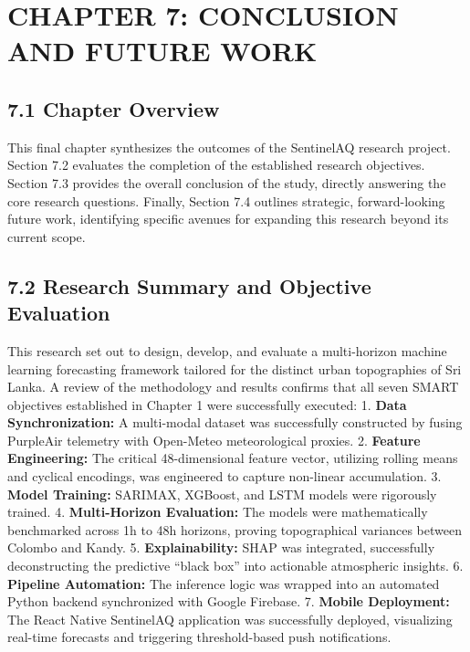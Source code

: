 \chapter{CHAPTER 7: CONCLUSION AND FUTURE
WORK}\label{chapter-7-conclusion-and-future-work}

\section{7.1 Chapter Overview}\label{chapter-overview}

This final chapter synthesizes the outcomes of the SentinelAQ research
project. Section 7.2 evaluates the completion of the established
research objectives. Section 7.3 provides the overall conclusion of the
study, directly answering the core research questions. Finally, Section
7.4 outlines strategic, forward-looking future work, identifying
specific avenues for expanding this research beyond its current scope.

\section{7.2 Research Summary and Objective
Evaluation}\label{research-summary-and-objective-evaluation}

This research set out to design, develop, and evaluate a multi-horizon
machine learning forecasting framework tailored for the distinct urban
topographies of Sri Lanka. A review of the methodology and results
confirms that all seven SMART objectives established in Chapter 1 were
successfully executed: 1. \textbf{Data Synchronization:} A multi-modal
dataset was successfully constructed by fusing PurpleAir telemetry with
Open-Meteo meteorological proxies. 2. \textbf{Feature Engineering:} The
critical 48-dimensional feature vector, utilizing rolling means and
cyclical encodings, was engineered to capture non-linear accumulation.
3. \textbf{Model Training:} SARIMAX, XGBoost, and LSTM models were
rigorously trained. 4. \textbf{Multi-Horizon Evaluation:} The models
were mathematically benchmarked across 1h to 48h horizons, proving
topographical variances between Colombo and Kandy. 5.
\textbf{Explainability:} SHAP was integrated, successfully
deconstructing the predictive ``black box'' into actionable atmospheric
insights. 6. \textbf{Pipeline Automation:} The inference logic was
wrapped into an automated Python backend synchronized with Google
Firebase. 7. \textbf{Mobile Deployment:} The React Native SentinelAQ
application was successfully deployed, visualizing real-time forecasts
and triggering threshold-based push notifications.

